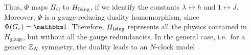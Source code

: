 Thus, $\Phi$ maps $H_{\text{G}}$ to $H_{\text{Ising}}$, if we identify the constants $\lambda \leftrightarrow h$ and $1 \leftrightarrow J$.
Moreover, $\Phi$ is a gauge-reducing duality homomorphism, since $\Phi(G_r) = \identity$.
Therefore, $H_{\text{Ising}}$ represents all the physics contained in $H_{\text{gauge}}$, but without all the gauge redundancies.
In the general case, i.e.~for a generic $\mathbb{Z}_N$ symmetry, the duality leads to an $N$-clock model \cite{radicevic2019spin}.

